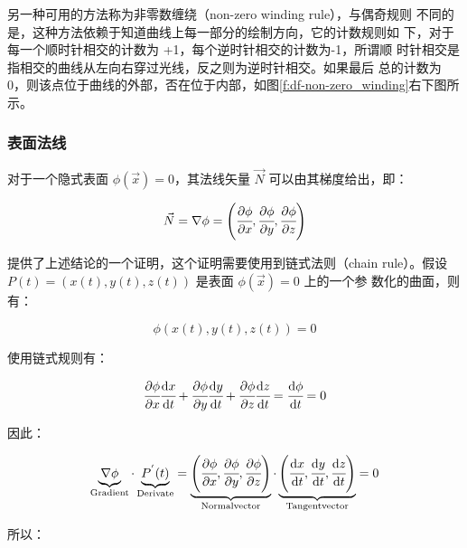 另一种可用的方法称为非零数缠绕（non-zero winding rule），与偶奇规则 不同的是，这种方法依赖于知道曲线上每一部分的绘制方向，它的计数规则如 下，对于每一个顺时针相交的计数为 +1，每个逆时针相交的计数为-1，所谓顺 时针相交是指相交的曲线从左向右穿过光线，反之则为逆时针相交。如果最后 总的计数为 0，则该点位于曲线的外部，否在位于内部，如图\ref{f:df-non-zero_winding}右下图所示。



\subsubsection{表面法线}
对于一个隐式表面 $\phi(\vec{x}) = 0$，其法线矢量 $\vec{N}$ 可以由其梯度给出，即：

\begin{equation}\label{e:df-normal}
	\vec{N}=\nabla\phi=\Biggl(\cfrac{\partial\phi}{\partial x},\cfrac{\partial\phi}{\partial y},\cfrac{\partial\phi}{\partial z}\Biggl)
\end{equation}

\cite{b:AnIntegratedIntroductiontoCG}提供了上述结论的一个证明，这个证明需要使用到链式法则（chain rule）。假设 $P (t) = (x(t), y(t), z(t))$ 是表面 $\phi(\vec{x}) = 0$ 上的一个参 数化的曲面，则有：

\begin{equation}
	\phi(x(t),y(t),z(t))=0
\end{equation}

\noindent 使用链式规则有：

\begin{equation}
	\cfrac{\partial\phi}{\partial x}\cfrac{{\rm d}x}{{\rm d}t}+\cfrac{\partial\phi}{\partial y}\cfrac{{\rm d}y}{{\rm d}t}+\cfrac{\partial\phi}{\partial z}\cfrac{{\rm d}z}{{\rm d}t}=\cfrac{{\rm d}\phi}{{\rm d}t}=0
\end{equation}

\noindent 因此：

\begin{equation}
	\underbrace{\nabla\phi}_{\rm Gradient}\cdot\underbrace{P^{'}(t)}_{\rm Derivate}=\underbrace{\Biggl(\cfrac{\partial\phi}{\partial x},\cfrac{\partial\phi}{\partial y},\cfrac{\partial\phi}{\partial z}\Biggl)}_{\rm Normal vector}\cdot\underbrace{\Biggl(\cfrac{{\rm d}x}{{\rm d}t},\cfrac{{\rm d}y}{{\rm d}t},\cfrac{{\rm d}z}{{\rm d}t}\Biggl)}_{\rm Tangent vector}=0
\end{equation}

\noindent 所以：

